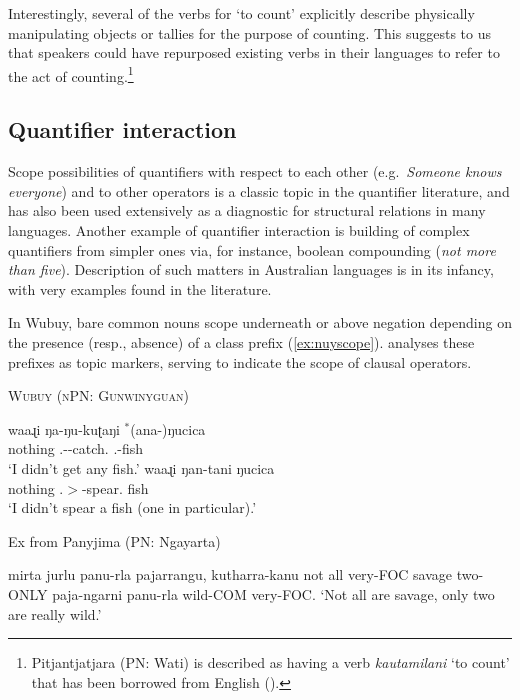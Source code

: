 \documentclass[12pt,egregdoesnotlikesansseriftitles]{scrartcl}
\begin{document}
Interestingly, several of the verbs for `to count' explicitly describe physically manipulating objects or tallies for the purpose of counting. This suggests to us that speakers could have repurposed existing verbs in their languages to refer to the act of counting.\footnote{Pitjantjatjara (PN: Wati) is described as having a verb \textit{kautamilani} `to count' that has been borrowed from English (\citealt[36]{goddard92}).}


\subsection{Quantifier interaction}
\label{sec:qfrscope}
Scope possibilities of quantifiers with respect to each other (e.g.\ \textit{Someone knows everyone}) and to other operators is a classic topic in the quantifier literature,  and has also been used extensively as a diagnostic for structural relations in many languages. Another example of quantifier interaction is building of complex quantifiers from simpler ones via, for instance, boolean compounding (\textit{not more than five}). Description of such matters in Australian languages is in its infancy, with very examples found in the literature.

In Wubuy, bare common nouns scope underneath or above negation depending on the presence (resp., absence) of a class prefix (\ref{ex:nuyscope}). \citet{baker08} analyses these prefixes as topic markers, serving to indicate the scope of clausal operators.
\begin{exe}
  \ex\label{ex:nuyscope} \textsc{Wubuy (nPN: Gunwinyguan)}\hfill {}
  \begin{xlist}
    \ex\label{ex:nsnar}\gll waaɻi ŋa-ŋu-kuʈaŋi $^*$(ana-)ŋucica\\
    nothing \Fsg.\Sarg-\Clneut-catch.\Pcon{} \phantom{$^*$(}\Clneut.\Top-fish\\
    `I didn't get any fish.'
    \ex\label{ex:nswide}\gll waaɻi ŋan-tani ŋucica\\
    nothing \Fsg.\Sarg$>$\Anim-spear.\Pcon{} fish\\
    `I didn't spear a fish (one in particular).'
  \end{xlist}
\end{exe}

Ex from Panyjima (PN: Ngayarta)

mirta     jurlu     panu-rla     pajarrangu,     kutharra-kanu  
not    all    very-FOC    savage      two-ONLY   
paja-ngarni     panu-rla   
wild-COM      very-FOC. 
‘Not all are savage, only two are really wild.’
\end{document}
